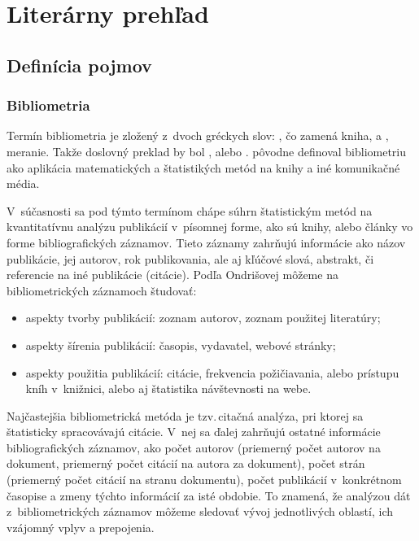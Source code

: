 \chapter{Literárny prehľad}

\section{Definícia pojmov}

\subsection{Bibliometria}

Termín bibliometria je zložený z~dvoch gréckych slov:
, čo zamená kniha, a
, meranie.  Takže doslovný
preklad by bol , alebo .
\citet{Pritchard1969} pôvodne definoval bibliometriu ako aplikácia
matematických a štatistikých metód na knihy a iné komunikačné média.

V~súčasnosti sa pod týmto termínom chápe súhrn štatistickým metód na
kvantitatívnu analýzu publikácií v~písomnej forme, ako sú knihy, alebo články
vo forme bibliografických záznamov.  Tieto záznamy zahrňujú informácie ako
názov publikácie, jej autorov, rok publikovania, ale aj kľúčové slová,
abstrakt, či referencie na iné publikácie (citácie).  Podľa Ondrišovej
\citeyearpar{Ondrisova2011} môžeme na bibliometrických záznamoch študovať:

\begin{itemize}
\item aspekty tvorby publikácií:  zoznam autorov, zoznam použitej literatúry;
\item aspekty šírenia publikácií:  časopis, vydavatel, webové stránky;
\item aspekty použitia publikácií:  citácie, frekvencia  požičiavania, alebo
    prístupu kníh v~knižnici, alebo aj štatistika návštevnosti na webe.

\end{itemize}

Najčastejšia bibliometrická metóda je tzv.\,citačná analýza,  pri ktorej sa štatisticky spracovávajú citácie.  V~nej sa ďalej
zahrňujú ostatné informácie bibliografických záznamov, ako počet autorov
(priemerný počet autorov na dokument, priemerný počet citácií na autora za
dokument), počet strán (priemerný počet citácií na stranu dokumentu), počet
publikácií v~konkrétnom časopise a zmeny týchto informácií za isté obdobie.  To
znamená, že analýzou dát z~bibliometrických záznamov môžeme sledovať vývoj
jednotlivých oblastí, ich vzájomný vplyv a prepojenia.

